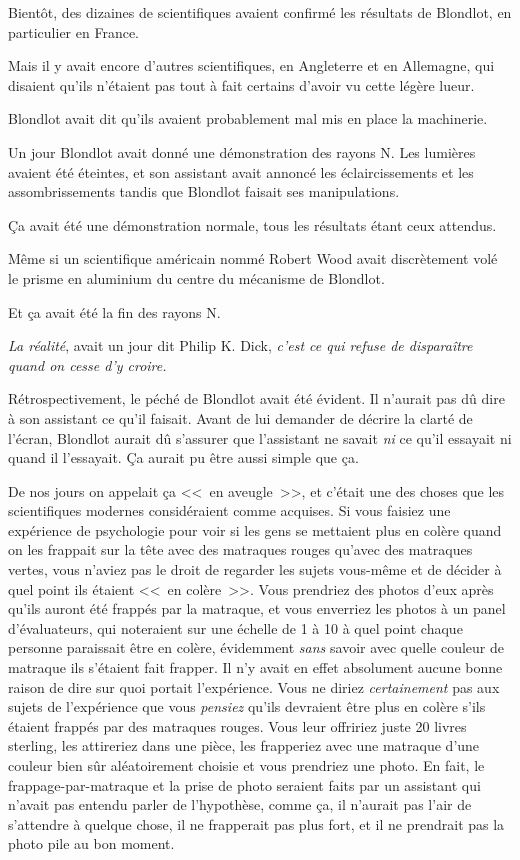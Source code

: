 Bientôt, des dizaines de scientifiques avaient confirmé les résultats de Blondlot, en particulier en France.

Mais il y avait encore d'autres scientifiques, en Angleterre et en Allemagne, qui disaient qu'ils n'étaient pas tout à fait certains d'avoir vu cette légère lueur.

Blondlot avait dit qu'ils avaient probablement mal mis en place la machinerie.

Un jour Blondlot avait donné une démonstration des rayons N. Les lumières avaient été éteintes, et son assistant avait annoncé les éclaircissements et les assombrissements tandis que Blondlot faisait ses manipulations.

Ça avait été une démonstration normale, tous les résultats étant ceux attendus.

Même si un scientifique américain nommé Robert Wood avait discrètement volé le prisme en aluminium du centre du mécanisme de Blondlot.

Et ça avait été la fin des rayons N.

\emph{La réalité}, avait un jour dit Philip K. Dick, \emph{c'est ce qui refuse de disparaître quand on cesse d'y croire.}

Rétrospectivement, le péché de Blondlot avait été évident. Il n'aurait pas dû dire à son assistant ce qu'il faisait. Avant de lui demander de décrire la clarté de l'écran, Blondlot aurait dû s'assurer que l'assistant ne savait \emph{ni} ce qu'il essayait ni quand il l'essayait. Ça aurait pu être aussi simple que ça.

De nos jours on appelait ça <<~en aveugle~>>, et c'était une des choses que les scientifiques modernes considéraient comme acquises. Si vous faisiez une expérience de psychologie pour voir si les gens se mettaient plus en colère quand on les frappait sur la tête avec des matraques rouges qu'avec des matraques vertes, vous n'aviez pas le droit de regarder les sujets vous-même et de décider à quel point ils étaient <<~en colère~>>. Vous prendriez des photos d'eux après qu'ils auront été frappés par la matraque, et vous enverriez les photos à un panel d'évaluateurs, qui noteraient sur une échelle de 1 à 10 à quel point chaque personne paraissait être en colère, évidemment \emph{sans} savoir avec quelle couleur de matraque ils s'étaient fait frapper. Il n'y avait en effet absolument aucune bonne raison de dire sur quoi portait l'expérience. Vous ne diriez \emph{certainement} pas aux sujets de l'expérience que vous \emph{pensiez} qu'ils devraient être plus en colère s'ils étaient frappés par des matraques rouges. Vous leur offririez juste 20 livres sterling, les attireriez dans une pièce, les frapperiez avec une matraque d'une couleur bien sûr aléatoirement choisie et vous prendriez une photo. En fait, le frappage-par-matraque et la prise de photo seraient faits par un assistant qui n'avait pas entendu parler de l'hypothèse, comme ça, il n'aurait pas l'air de s'attendre à quelque chose, il ne frapperait pas plus fort, et il ne prendrait pas la photo pile au bon moment.

